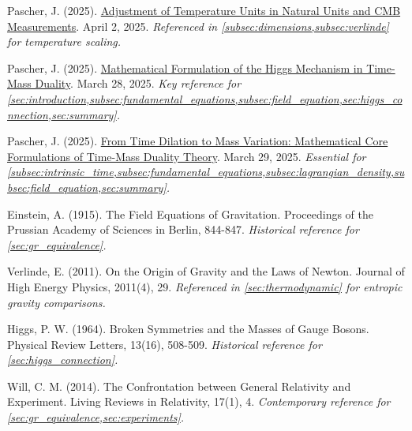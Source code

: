 \documentclass[12pt,a4paper]{article}
\begin{document}
\begin{thebibliography}{9}
		 Pascher, J. (2025). \href{https://github.com/jpascher/T0-Time-Mass-Duality/tree/main/2/pdf/English/TempEinheitenCMBEn.pdf}{Adjustment of Temperature Units in Natural Units and CMB Measurements}. April 2, 2025. \textit{Referenced in \cref{subsec:dimensions,subsec:verlinde} for temperature scaling.}
		
		 Pascher, J. (2025). \href{https://github.com/jpascher/T0-Time-Mass-Duality/tree/main/2/pdf/English/MathHiggsZeitMasseEn.pdf}{Mathematical Formulation of the Higgs Mechanism in Time-Mass Duality}. March 28, 2025. \textit{Key reference for \cref{sec:introduction,subsec:fundamental_equations,subsec:field_equation,sec:higgs_connection,sec:summary}.}
		
		 Pascher, J. (2025). \href{https://github.com/jpascher/T0-Time-Mass-Duality/tree/main/2/pdf/English/MathZeitMasseLagrangeEn.pdf}{From Time Dilation to Mass Variation: Mathematical Core Formulations of Time-Mass Duality Theory}. March 29, 2025. \textit{Essential for \cref{subsec:intrinsic_time,subsec:fundamental_equations,subsec:lagrangian_density,subsec:field_equation,sec:summary}.}
		
		 Einstein, A. (1915). The Field Equations of Gravitation. Proceedings of the Prussian Academy of Sciences in Berlin, 844-847. \textit{Historical reference for \cref{sec:gr_equivalence}.}
		
		 Verlinde, E. (2011). On the Origin of Gravity and the Laws of Newton. Journal of High Energy Physics, 2011(4), 29. \textit{Referenced in \cref{sec:thermodynamic} for entropic gravity comparisons.}
		
		 Higgs, P. W. (1964). Broken Symmetries and the Masses of Gauge Bosons. Physical Review Letters, 13(16), 508-509. \textit{Historical reference for \cref{sec:higgs_connection}.}
		
		 Will, C. M. (2014). The Confrontation between General Relativity and Experiment. Living Reviews in Relativity, 17(1), 4. \textit{Contemporary reference for \cref{sec:gr_equivalence,sec:experiments}.}
	\end{thebibliography}
	
\end{document}
